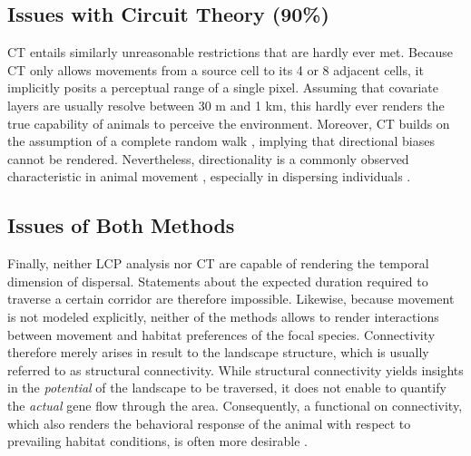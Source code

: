 \documentclass[abstract=on,10pt,a4paper,bibliography=totocnumbered]{article}
\begin{document}
\subsection{Issues with Circuit Theory (90\%)}
CT entails similarly unreasonable restrictions that are hardly ever met. Because
CT only allows movements from a source cell to its 4 or 8 adjacent cells, it
implicitly posits a perceptual range of a single pixel. Assuming that covariate
layers are usually resolve between 30 m and 1 km, this hardly ever renders the
true capability of animals to perceive the environment. Moreover, CT builds on
the assumption of a complete random walk \citep{Diniz.2020}, implying that
directional biases cannot be rendered. Nevertheless, directionality is a
commonly observed characteristic in animal movement \citep{Bovet.1991,
Schultz.2001}, especially in dispersing individuals \citep{Cozzi.2020,
Hofmann.2021}.

\subsection{Issues of Both Methods}
Finally, neither LCP analysis nor CT are capable of rendering the temporal
dimension of dispersal. Statements about the expected duration required to
traverse a certain corridor are therefore impossible. Likewise, because movement
is not modeled explicitly, neither of the methods allows to render interactions
between movement and habitat preferences of the focal species. Connectivity
therefore merely arises in result to the landscape structure, which is usually
referred to as structural connectivity. While structural connectivity yields
insights in the \textit{potential} of the landscape to be traversed, it does not
enable to quantify the \textit{actual} gene flow through the area. Consequently,
a functional on connectivity, which also renders the behavioral response of the
animal with respect to prevailing habitat conditions, is often more desirable
\citep{Tischendorf.2000, Baguette.2013}.

\end{document}

